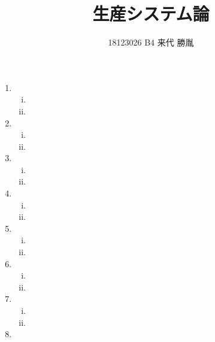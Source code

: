 \documentclass[a4paper]{jsarticle}
\author{18123026 B4 来代 勝胤}
\title{生産システム論}
\date{}
\begin{document}
\maketitle
\section{}
\begin{enumerate}[(1)]
	\item
		\begin{enumerate}[(i)]
			\item 
			\item 
		\end{enumerate}
		\par
		\item
		\begin{enumerate}[(i)]
			\item 
			\item 
		\end{enumerate}
		\par	\item
		\begin{enumerate}[(i)]
			\item 
			\item 
		\end{enumerate}
		\par	\item
		\begin{enumerate}[(i)]
			\item 
			\item 
		\end{enumerate}
		\par	\item
		\begin{enumerate}[(i)]
			\item 
			\item 
		\end{enumerate}
		\par	\item
		\begin{enumerate}[(i)]
			\item 
			\item 
		\end{enumerate}
		\par	\item
		\begin{enumerate}[(i)]
			\item 
			\item 
		\end{enumerate}
		\par	\item

\end{enumerate}
\end{document}
